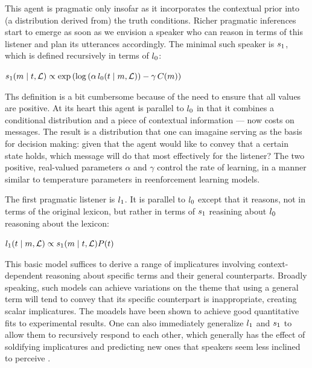 \documentclass{article}
\begin{document}
This agent is pragmatic only insofar as it incorporates the contextual 
prior into (a distribution derived from) the truth conditions. Richer
pragmatic inferences start to emerge as soon as we envision a speaker
who can reason in terms of this listener and plan its utterances 
accordingly. The minimal such speaker is $s_{1}$, which is 
defined recursively in terms of $l_{0}$:
%
\begin{examples}
  \item\label{s1}%
    $s_{1}(m \mid t, \mathcal{L}) \propto
    \exp
    \left(
      \log\left(\alpha\,l_{0}(t \mid m, \mathcal{L}) \right)
      - 
      \gamma\,C(m)
    \right)$
\end{examples}
%
Ths definition is a bit cumbersome because of the need to ensure that
all values are positive. At its heart this agent is parallel to
$l_{0}$ in that it combines a conditional distribution and a
piece of contextual information --- now costs on messages. The result
is a distribution that one can imagaine serving as the basis for
decision making: given that the agent would like to convey that a
certain state holds, which message will do that most effectively for
the listener? The two positive, real-valued parameters $\alpha$ and
$\gamma$ control the rate of learning, in a manner similar to
temperature parameters in reenforcement learning models.

The first pragmatic listener is $l_{1}$. It is parallel to
$l_{0}$ except that it reasons, not in terms of the original
lexicon, but rather in terms of $s_{1}$ reasining about
$l_{0}$ reasoning about the lexicon:
%
\begin{examples}
  \item\label{l1}%
    $l_{1}(t \mid m, \mathcal{L}) \propto 
    s_{1}(m \mid t, \mathcal{L})
    P(t)$
\end{examples}

This basic model suffices to derive a range of implicatures involving
context-dependent reasoning about specific terms and their general
counterparts. Broadly speaking, such models can achieve variations on
the theme that using a general term will tend to convey that its
specific counterpart is inappropriate, creating scalar implicatures.
The moadels have been shown to achieve good quantitative fits to
experimental results.  One can also immediately generalize
$l_{1}$ and $s_{1}$ to allow them to recursively respond
to each other, which generally has the effect of soldifying
implicatures and predicting new ones that speakers seem less inclined
to perceive \citep{Vogel-etal:2014}.
\end{document}

